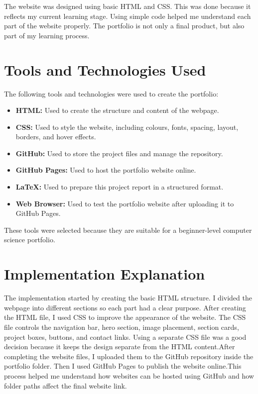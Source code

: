 \documentclass[12pt,a4paper]{article}
\begin{document}
The website was designed using basic HTML and CSS. This was done because it reflects my current learning stage.
Using simple code helped me understand each part of the website properly. The portfolio is not only a final product, but also part of my learning process.
\section{Tools and Technologies Used}

The following tools and technologies were used to create the portfolio:

\begin{itemize}
\item \textbf{HTML:} Used to create the structure and content of the webpage.


\item \textbf{CSS:} Used to style the website, including colours, fonts, spacing, layout, borders, and hover effects.

\item \textbf{GitHub:} Used to store the project files and manage the repository.

\item \textbf{GitHub Pages:} Used to host the portfolio website online.

\item \textbf{LaTeX:} Used to prepare this project report in a structured format.

\item \textbf{Web Browser:} Used to test the portfolio website after uploading it to GitHub Pages.


\end{itemize}

These tools were selected because they are suitable for a beginner-level computer science portfolio.

\section{Implementation Explanation}

The implementation started by creating the basic HTML structure. I divided the webpage into different sections so each part had a clear purpose.
After creating the HTML file, I used CSS to improve the appearance of the website. The CSS file controls the navigation bar, hero section, image placement, section cards, project boxes, buttons, and contact links.
Using a separate CSS file was a good decision because it keeps the design separate from the HTML content.After completing the website files, I uploaded them to the GitHub repository inside the portfolio folder. Then I used GitHub Pages to publish the website online.This process helped me understand how websites can be hosted using GitHub and how folder paths affect the final website link.
\end{document}
